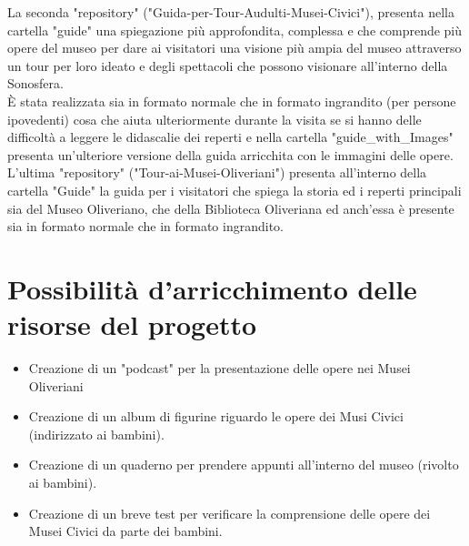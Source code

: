 \documentclass[hidelinks,12pt,a4paper]{article}
\begin{document}
\begin{flushleft}
				  \bigskip
				  La seconda "repository" ("Guida-per-Tour-Audulti-Musei-Civici"), presenta nella cartella "guide" una spiegazione più approfondita, complessa e che comprende più opere del museo per dare ai visitatori una visione più ampia del museo attraverso un tour per loro ideato e degli spettacoli che possono visionare all'interno della Sonosfera.\\
				  È stata realizzata sia in formato normale che in formato ingrandito (per persone ipovedenti) cosa che aiuta ulteriormente durante la visita se si hanno delle difficoltà a leggere le didascalie dei reperti e nella cartella "guide_with_Images" presenta un'ulteriore versione della guida arricchita con le immagini delle opere.\\
				  L'ultima "repository" ("Tour-ai-Musei-Oliveriani") presenta all'interno della cartella "Guide" la guida per i visitatori che spiega la storia ed i reperti principali sia del Museo Oliveriano, che della Biblioteca Oliveriana ed anch'essa è presente sia in formato normale che in formato ingrandito.
				 
		\section{Possibilità d'arricchimento delle risorse del progetto}
		
		\begin{itemize}
			\item Creazione di un "podcast" per la presentazione delle opere nei Musei Oliveriani
			\item Creazione di un album di figurine riguardo le opere dei Musi Civici (indirizzato ai bambini).
			\item Creazione di un quaderno per prendere appunti all'interno del museo (rivolto ai bambini).
			\item Creazione di un breve test per verificare la comprensione delle opere dei Musei Civici da parte dei bambini.  
		\end{itemize}
	
		\vspace*{\fill}
		\doclicenseThis
				
	\end{flushleft}
\end{document}
